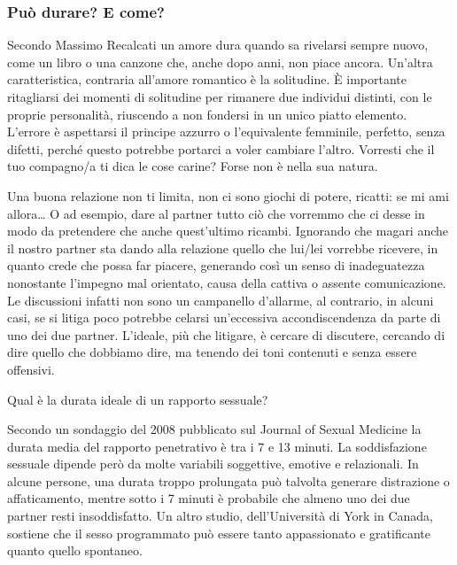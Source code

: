 \documentclass[12pt]{book} %
\begin{document}
\subsubsection{Può durare? E come?}
Secondo Massimo Recalcati un amore dura quando sa rivelarsi sempre nuovo, come un libro o una canzone che, anche dopo anni, non piace ancora. Un'altra caratteristica, contraria all'amore romantico è la solitudine. È importante ritagliarsi dei momenti di solitudine per rimanere due individui distinti, con le proprie personalità, riuscendo a non fondersi in un unico piatto elemento. 
L'errore è aspettarsi il principe azzurro o l'equivalente femminile, perfetto, senza difetti, perché questo potrebbe portarci a voler cambiare l'altro. Vorresti che il tuo compagno/a ti dica le cose carine? Forse non è nella sua natura.

Una buona relazione non ti limita, non ci sono giochi di potere, ricatti: se mi ami allora… O ad esempio, dare al partner tutto ciò che vorremmo che
ci desse in modo da pretendere che anche quest'ultimo ricambi. Ignorando che magari anche il nostro partner sta dando alla relazione quello che lui/lei vorrebbe ricevere, in quanto crede che possa far piacere, generando così un senso di inadeguatezza nonostante l'impegno mal orientato, causa della cattiva o assente comunicazione. Le discussioni infatti non sono un campanello d'allarme, al contrario, in alcuni casi, se si litiga poco potrebbe celarsi un'eccessiva accondiscendenza da parte di uno dei due partner. L'ideale, più che litigare, è cercare di discutere, cercando di dire quello che dobbiamo dire, ma tenendo dei toni contenuti e senza essere offensivi.

\begin{mdframed}[linewidth=1pt]
Qual è la durata ideale di un rapporto sessuale?

Secondo un sondaggio del 2008 pubblicato sul Journal of Sexual Medicine la durata media del rapporto penetrativo è tra i 7 e 13 minuti. La soddisfazione sessuale dipende però da molte variabili soggettive, emotive e relazionali. In alcune persone, una durata troppo prolungata può talvolta generare distrazione o affaticamento, mentre sotto i 7 minuti è probabile che almeno uno dei due partner resti insoddisfatto.
Un altro studio, dell’Università di York in Canada, sostiene che il sesso programmato può essere tanto appassionato e gratificante quanto quello spontaneo.
\end{mdframed}
\end{document}
